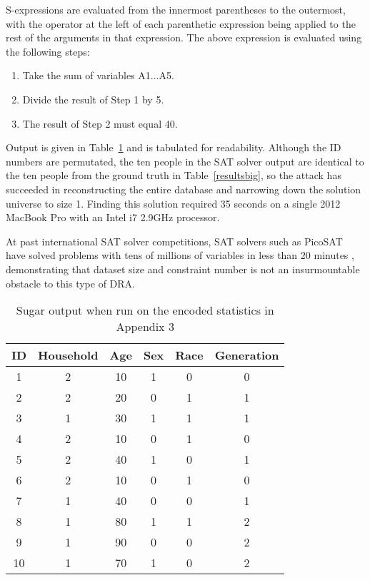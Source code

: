 \documentclass[5p,times,11pt]{elsarticle}
\begin{document}
S-expressions are evaluated from the innermost parentheses to the outermost, with the operator at the left of each parenthetic expression being applied to the rest of the arguments in that expression. The above expression is evaluated using the following steps:
\begin{enumerate}
    \item Take the sum of variables A1...A5.
    \item Divide the result of Step 1 by 5.
    \item The result of Step 2 must equal 40.
\end{enumerate}

Output is given in Table~\ref{sugarbig} and is tabulated for readability. Although the ID numbers are permutated, the ten people in the SAT solver output are identical to the ten people from the ground truth in Table~\ref{resultsbig}, so the attack has succeeded in reconstructing the entire database and narrowing down the solution universe to size 1. Finding this solution required 35 seconds on a single 2012 MacBook Pro with an Intel i7 2.9GHz processor.

At past international SAT solver competitions, SAT solvers such as PicoSAT have solved problems with tens of millions of variables in less than 20 minutes \cite{satcomp}, demonstrating that dataset size and constraint number is not an insurmountable obstacle to this type of DRA.

\begin{table}
\begin{tabular}{c|c|c|c|c|c}
ID & Household & Age & Sex & Race & Generation \\
\hline
1 & 2 & 10 & 1 & 0 & 0  \\
2 & 2 & 20 & 0 & 1 & 1  \\
3 & 1 & 30 & 1 & 1 & 1  \\
4 & 2 & 10 & 0 & 1 & 0  \\
5 & 2 & 40 & 1 & 0 & 1  \\
6 & 2 & 10 & 0 & 1 & 0  \\
7 & 1 & 40 & 0 & 0 & 1  \\
8 & 1 & 80 & 1 & 1 & 2  \\
9 & 1 & 90 & 0 & 0 & 2 \\
10 & 1 & 70 & 1 & 0 & 2 \\
\hline
\end{tabular}
\caption{Sugar output when run on the encoded statistics in Appendix 3}\label{sugarbig}
\end{table}
\end{document}

